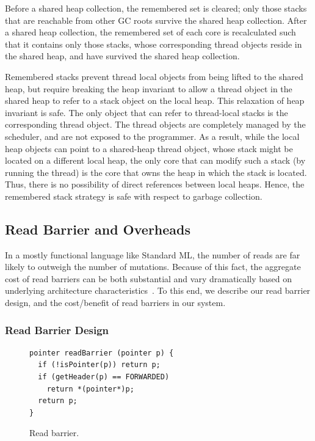 Before a shared heap collection, the remembered set is cleared; only those
stacks that are reachable from other GC roots survive the shared heap
collection. After a shared heap collection, the remembered set of each core is
recalculated such that it contains only those stacks, whose corresponding
thread objects reside in the shared heap, and have survived the shared heap
collection.

Remembered stacks prevent thread local objects from being lifted to the shared
heap, but require breaking the heap invariant to allow a thread object in the
shared heap to refer to a stack object on the local heap. This relaxation of
heap invariant is safe. The only object that can refer to thread-local stacks
is the corresponding thread object. The thread objects are completely managed
by the scheduler, and are not exposed to the programmer. As a result, while the
local heap objects can point to a shared-heap thread object, whose stack might
be located on a different local heap, the only core that can modify such a
stack (by running the thread) is the core that owns the heap in which the stack
is located. Thus, there is no possibility of direct references between local
heaps. Hence, the remembered stack strategy is safe with respect to garbage
collection.

\subsection{Read Barrier and Overheads}

In a mostly functional language like Standard ML, the number of reads are far
likely to outweigh the number of mutations. Because of this fact, the aggregate
cost of read barriers can be both substantial and vary dramatically based on
underlying architecture characteristics~\cite{Blackburn04}. To this end, we
describe our read barrier design, and the cost/benefit of read barriers in our
system.

\subsubsection{Read Barrier Design}

\begin{figure}
\begin{lstlisting}
pointer readBarrier (pointer p) {
  if (!isPointer(p)) return p;
  if (getHeader(p) == FORWARDED)
    return *(pointer*)p;
  return p;
}
\end{lstlisting}
\caption{Read barrier.}
\label{code:read_barrier}
\end{figure}


